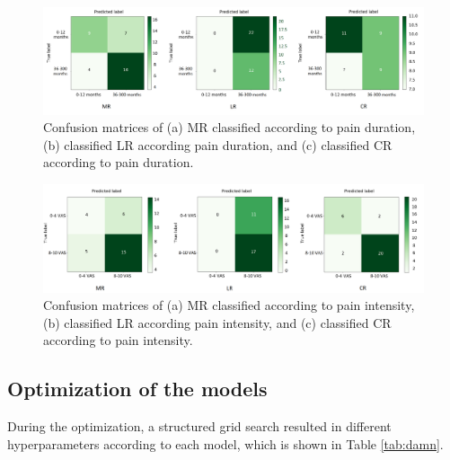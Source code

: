 \begin{figure} [b!]
    \includegraphics[width=1\textwidth]{Figures/samcon}
  \caption{Confusion matrices of (a) MR classified according to pain duration, (b) classified LR according pain duration, and (c) classified CR according to pain duration.}
  \label{fig:confma}
\end{figure}

\begin{figure} [t!]
    \includegraphics[width=1\textwidth]{Figures/samcon1}
  \caption{Confusion matrices of (a) MR classified according to pain intensity, (b) classified LR according pain intensity, and (c) classified CR according to pain intensity.}
  \label{fig:confma1}
\end{figure}

\vspace{-0.3cm}
\subsection{Optimization of the models}
During the optimization, a structured grid search resulted in different hyperparameters according to each model, which is shown in Table \ref{tab:damn}.

